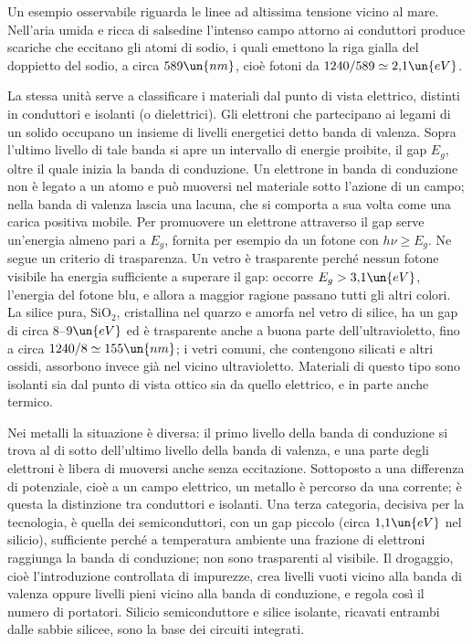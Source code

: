 \documentclass[main.tex]{subfiles}
\begin{document}
	Un esempio osservabile riguarda le linee ad altissima tensione vicino al mare. Nell'aria umida e ricca di salsedine l'intenso campo attorno ai conduttori produce scariche che eccitano gli atomi di sodio, i quali emettono la riga gialla del doppietto del sodio, a circa $589\un{nm}$, cioè fotoni da $1240/589\simeq2{,}1\un{eV}$.
	
	La stessa unità serve a classificare i materiali dal punto di vista elettrico, distinti in conduttori e isolanti (o dielettrici). Gli elettroni che partecipano ai legami di un solido occupano un insieme di livelli energetici detto banda di valenza. Sopra l'ultimo livello di tale banda si apre un intervallo di energie proibite, il gap $E_g$, oltre il quale inizia la banda di conduzione. Un elettrone in banda di conduzione non è legato a un atomo e può muoversi nel materiale sotto l'azione di un campo; nella banda di valenza lascia una lacuna, che si comporta a sua volta come una carica positiva mobile. Per promuovere un elettrone attraverso il gap serve un'energia almeno pari a $E_g$, fornita per esempio da un fotone con $h\nu\ge E_g$. Ne segue un criterio di trasparenza. Un vetro è trasparente perché nessun fotone visibile ha energia sufficiente a superare il gap: occorre $E_g>3{,}1\un{eV}$, l'energia del fotone blu, e allora a maggior ragione passano tutti gli altri colori. La silice pura, $\mathrm{SiO_2}$, cristallina nel quarzo e amorfa nel vetro di silice, ha un gap di circa $8$--$9\un{eV}$ ed è trasparente anche a buona parte dell'ultravioletto, fino a circa $1240/8\simeq155\un{nm}$; i vetri comuni, che contengono silicati e altri ossidi, assorbono invece già nel vicino ultravioletto. Materiali di questo tipo sono isolanti sia dal punto di vista ottico sia da quello elettrico, e in parte anche termico.
	
	Nei metalli la situazione è diversa: il primo livello della banda di conduzione si trova al di sotto dell'ultimo livello della banda di valenza, e una parte degli elettroni è libera di muoversi anche senza eccitazione. Sottoposto a una differenza di potenziale, cioè a un campo elettrico, un metallo è percorso da una corrente; è questa la distinzione tra conduttori e isolanti. Una terza categoria, decisiva per la tecnologia, è quella dei semiconduttori, con un gap piccolo (circa $1{,}1\un{eV}$ nel silicio), sufficiente perché a temperatura ambiente una frazione di elettroni raggiunga la banda di conduzione; non sono trasparenti al visibile. Il drogaggio, cioè l'introduzione controllata di impurezze, crea livelli vuoti vicino alla banda di valenza oppure livelli pieni vicino alla banda di conduzione, e regola così il numero di portatori. Silicio semiconduttore e silice isolante, ricavati entrambi dalle sabbie silicee, sono la base dei circuiti integrati.
	
\end{document}
